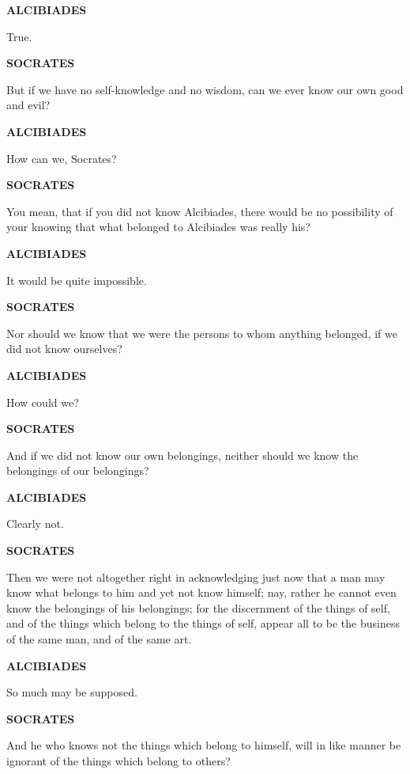 \documentclass[11pt,letter]{article}
\begin{document}
\par \textbf{ALCIBIADES}
\par   True.

\par \textbf{SOCRATES}
\par   But if we have no self-knowledge and no wisdom, can we ever know our own good and evil?

\par \textbf{ALCIBIADES}
\par   How can we, Socrates?

\par \textbf{SOCRATES}
\par   You mean, that if you did not know Alcibiades, there would be no possibility of your knowing that what belonged to Alcibiades was really his?

\par \textbf{ALCIBIADES}
\par   It would be quite impossible.

\par \textbf{SOCRATES}
\par   Nor should we know that we were the persons to whom anything belonged, if we did not know ourselves?

\par \textbf{ALCIBIADES}
\par   How could we?

\par \textbf{SOCRATES}
\par   And if we did not know our own belongings, neither should we know the belongings of our belongings?

\par \textbf{ALCIBIADES}
\par   Clearly not.

\par \textbf{SOCRATES}
\par   Then we were not altogether right in acknowledging just now that a man may know what belongs to him and yet not know himself; nay, rather he cannot even know the belongings of his belongings; for the discernment of the things of self, and of the things which belong to the things of self, appear all to be the business of the same man, and of the same art.

\par \textbf{ALCIBIADES}
\par   So much may be supposed.

\par \textbf{SOCRATES}
\par   And he who knows not the things which belong to himself, will in like manner be ignorant of the things which belong to others?
\end{document}
